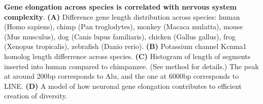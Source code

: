 \textbf{Gene elongation across species is correlated with nervous system complexity}.
\textbf{(A)} Difference gene length distribution across species: human (Homo sapiens), chimp (Pan troglodytes), monkey (Macaca mulatta), mouse (Mus musculus), dog (Canis lupus familiaris), chicken (Gallus gallus), frog (Xenopus tropicalis), zebrafish (Danio rerio). 
\textbf{(B)} Potassium channel Kcnma1 homolog length differrence across species.
\textbf{(C)} Histogram of length of segments inserted into human compared to chimpanzee. (See method for details.) The peak at around 200bp corresponds to Alu, and the one at 6000bp corresponds to LINE.
\textbf{(D)} A model of how neuronal gene elongation contributes to efficient creation of diversity. 
